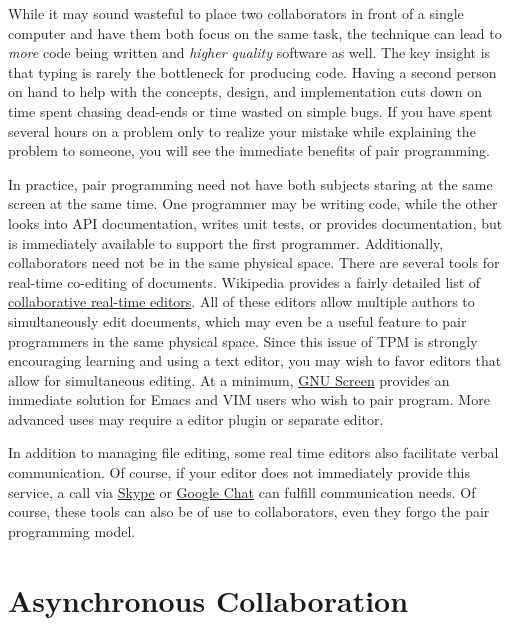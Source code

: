 \documentclass[]{article}
\begin{document}
While it may sound wasteful to place two collaborators in front of a single
computer and have them both focus on the same task, the technique can lead to
\emph{more} code being written and \emph{higher quality} software as well. The
key insight is that typing is rarely the bottleneck for producing code. Having
a second person on hand to help with the concepts, design, and implementation
cuts down on time spent chasing dead-ends or time wasted on simple bugs.
If you have spent several hours on a problem only to realize your mistake
while explaining the problem to someone, you will see the immediate benefits
of pair programming. 

In practice, pair programming need not have both subjects staring at the same
screen at the same time. One programmer may be writing code, while the other
looks into API documentation, writes unit tests, or provides documentation,
but is immediately available to support the first programmer. Additionally,
collaborators need not be in the same physical space. There are several tools
for real-time co-editing of documents. Wikipedia provides a fairly detailed
list of \href{http://en.wikipedia.org/wiki/Collaborative_real-time_editor}{collaborative real-time
editors}. All of these editors allow multiple authors to simultaneously edit
documents, which may even be a useful feature to pair programmers in the same
physical space. Since this issue of TPM is strongly encouraging learning and
using a text editor, you may wish to favor editors that allow for simultaneous
editing. At a minimum, \href{http://www.gnu.org/software/screen/}{GNU Screen}
provides an immediate solution for Emacs and VIM users who wish to pair program.
More advanced uses may require a editor plugin or separate editor.

In addition to managing file editing, some real time editors also facilitate
verbal communication. Of course, if your editor does not immediately provide
this service, a call via \href{http://www.skype.com}{Skype} or
\href{http://chat.google.com}{Google Chat} can fulfill communication needs. Of
course, these tools can also be of use to collaborators, even they forgo the
pair programming model.

\section{Asynchronous Collaboration}
\end{document}
